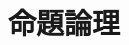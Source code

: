\documentclass[a4paper]{jsarticle}
\title{\myTitle}
\author{\myAuthor}
\begin{document}
\maketitle

\section{命題論理}



\end{document}
